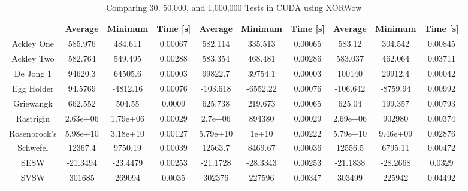 \documentclass{article}
\begin{document}
        \begin{table}[h]
            \begin{centering}
                \begin{tabular}{|c||c|c|c||c|c|c||c|c|c|}
                    \hline
                                & Average & Minimum & Time [s] & Average & Minimum & Time [s] & Average & Minimum & Time [s] \\
                    \hline
                    \hline
                    Ackley One & 585.976 & 484.611 & 0.00067 & 582.114 & 335.513 & 0.00065 & 583.12 & 304.542 & 0.00845 \\ 
                    \hline
                    Ackley Two & 582.764 & 549.495 & 0.00288 & 583.354 & 468.481 & 0.00286 & 583.037 & 462.064 & 0.03711 \\
                    \hline
                    De Jong 1 & 94620.3 & 64505.6 & 0.00003 & 99822.7 & 39754.1 & 0.00003 & 100140 & 29912.4 & 0.00042\\
                    \hline
                    Egg Holder & 94.5769 & -4812.16 & 0.00076 & -103.618 & -6552.22 & 0.00076 & -106.642 & -8759.94 & 0.00992 \\
                    \hline
                    Griewangk & 662.552 & 504.55 & 0.0009 & 625.738 & 219.673 & 0.00065 & 625.04 & 199.357 & 0.00793 \\
                    \hline
                    Rastrigin & 2.63e+06 & 1.79e+06 & 0.00029 & 2.7e+06 & 894380 & 0.00029 & 2.69e+06 & 902980 & 0.00374 \\
                    \hline
                    Rosenbrock's & 5.98e+10 & 3.18e+10 & 0.00127 & 5.79e+10 & 1e+10 & 0.00222 & 5.79e+10 & 9.46e+09 & 0.02876\\
                    \hline
                    Schwefel & 12367.4 & 9750.19 & 0.00039 & 12563.7 & 8469.67 & 0.00036 & 12556.5 & 6795.11 & 0.00472 \\
                    \hline
                    SESW & -21.3494 & -23.4479 & 0.00253 & -21.1728 & -28.3343 & 0.00253 & -21.1838 & -28.2668 & 0.0329 \\
                    \hline
                    SVSW & 301685 & 269094 & 0.0035 & 302376 & 227596 & 0.00347 & 303499 & 225942 & 0.04492 \\
                    \hline
                \end{tabular}
                \caption{Comparing 30, 50,000, and 1,000,000 Tests in CUDA using XORWow}
            \end{centering}
            \end{table}
\end{document}
